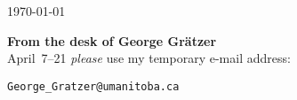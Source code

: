 \documentclass{article}
\begin{document}
\begin{flushright}
   \today
\end{flushright}
\textbf{From the desk of George Gr\"{a}tzer}\\[22pt]
April~7--21 \emph{please} use my temporary e-mail address:
\begin{center}
   \texttt{George\_Gratzer@umanitoba.ca}
\end{center}
\end{document}
